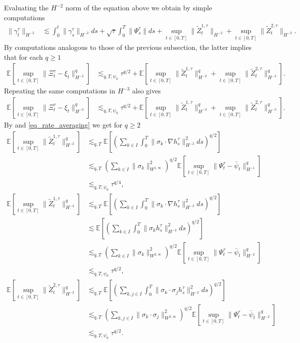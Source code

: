 \documentclass[a4paper,10pt]{amsart}
\newcommand{\expt}[1]{\mathbb{E}\left[#1\right]}
\theoremstyle{remark}
\numberwithin{equation}{section}
\begin{document}
Evaluating the $H^{-2}$ norm of the equation above we obtain by simple computations
\begin{align*}
   \|\gamma^{\tau}_t \|_{H^{-2}}
   &\lesssim \int_0^t \|\gamma^{\tau}_s \|_{H^{-2}} ds
   +\sqrt{\tau} \int_0^T \|\Psi^{\tau}_s\| ds+\sup_{t\in [0,T]}\|\tilde{Z}^{1,\tau}_t\|_{H^{-2}}
   +\sup_{t\in [0,T]}\|\tilde{Z}^{2,\tau}_t\|_{H^{-2}}.
\end{align*}
By computations analogous to those of the previous subsection, the latter implies that for each $q\geq 1$
\begin{align*}
    \expt{\sup_{t\in [0,T]}\|\Xi^{\tau}_t-\xi_t \|_{H^{-2}}^q}
    &\lesssim_{q,T,\psi_0}\tau^{q/2}
    +\expt{\sup_{t\in [0,T]}
    \|\tilde{Z}^{1,\tau}_t\|_{H^{-2}}^q+\sup_{t\in [0,T]}
    \|\tilde{Z}^{2,\tau}_t\|_{H^{-2}}^q}.
\end{align*}
Repeating the same computations in $H^{-3}$ also gives
\begin{align*}
    \expt{\sup_{t\in [0,T]}\|\Xi^{\tau}_t-\xi_t \|_{H^{-3}}^q}
    &\lesssim_{q,T,\psi_0}\tau^{q/2}
    +\expt{\sup_{t\in [0,T]}
    \|\tilde{Z}^{1,\tau}_t\|_{H^{-3}}^q+\sup_{t\in [0,T]}
    \|\tilde{Z}^{2,\tau}_t\|_{H^{-3}}^q}.
\end{align*}
By \cite[Theorem 1, Remark 2]{tubaro1984estimate} and \eqref{eq_rate_averaging} we get for $q\geq 2$ 
\begin{align*}
    \expt{\sup_{t\in [0,T]}\|\tilde{Z}^{1,\tau}_t\|_{H^{-2}}^q}&\lesssim_{q,T} \expt{\left(\sum_{k\in I}\int_0^T\|\sigma_k\cdot\nabla h^{\tau}_s\|_{H^{-2}}^2 ds\right)^{q/2}}\\ & \lesssim_{q,T}  \left(\sum_{k\in I}\|\sigma_k\|_{W^{1,\infty}}^2 \right)^{q/2}\expt{\sup_{t\in [0,T]}\|\Psi^{\tau}_t-\bar\psi_t\|_{H^{-1}}^q}\\ & \lesssim_{q,T,\psi_0} \tau^{q/4},\\
    \expt{\sup_{t\in [0,T]}\|\tilde{Z}^{1,\tau}_t\|_{H^{-3}}^q}&\lesssim_{q,T} \expt{\left(\sum_{k\in I}\int_0^T\|\sigma_k\cdot\nabla h^{\tau}_s\|_{H^{-3}}^2 ds\right)^{q/2}}\\ &\lesssim \expt{\left(\sum_{k\in I}\int_0^T\|\sigma_k h^{\tau}_s\|_{H^{-2}}^2 ds\right)^{q/2}}\\ & \lesssim_{q,T}  \left(\sum_{k\in I}\|\sigma_k\|_{W^{2,\infty}}^2 \right)^{q/2}\expt{\sup_{t\in [0,T]}\|\Psi^{\tau}_t-\bar\psi_t\|_{H^{-2}}^q}\\ & \lesssim_{q,T,\psi_0} \tau^{q/2},
    \\
     \expt{\sup_{t\in [0,T]}\|\tilde{Z}^{2,\tau}_t\|_{H^{-2}}^q}&\lesssim_{q,T} \expt{\left(\sum_{k,j\in I}\int_0^T\|\sigma_k\cdot\sigma_j h^{\tau}_s\|_{H^{-2}}^2 ds\right)^{q/2}}\\
	     &\lesssim_{q,T} \left(\sum_{k,j\in I}\|\sigma_k\cdot\sigma_j\|_{W^{2,\infty}}^2 \right)^{q/2}\expt{\sup_{t\in [0,T]}\|\Psi^{\tau}_t-\bar\psi_t\|_{H^{-2}}^q}\\ & \lesssim_{q,T,\psi_0} \tau^{q/2}.
\end{align*}
\end{document}
